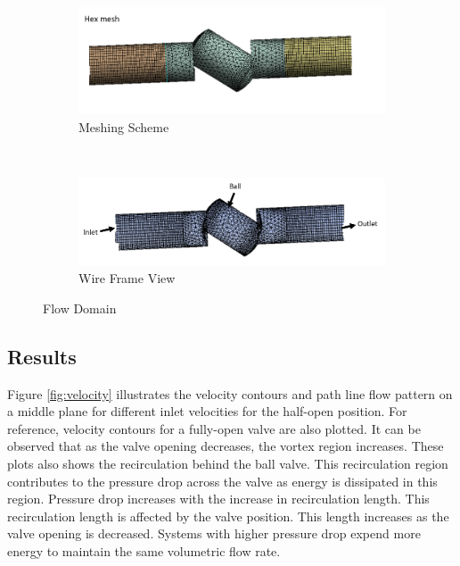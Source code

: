 \documentclass[]{article}
\begin{document}
\begin{figure}
	\centering
	\begin{subfigure}[h]{0.8\textwidth}
		\includegraphics[width=\textwidth]{Photos/Flow_Domain}
		\caption{Meshing Scheme}
	\end{subfigure}
	~ %
	
	\begin{subfigure}[h]{0.8\textwidth}
		\includegraphics[width=\textwidth]{Photos/Wire_Frame}
		\caption{Wire Frame View}
	\end{subfigure}
	\caption{Flow Domain}\label{fig:Mesh}
\end{figure}
\FloatBarrier
\subsection{Results}
Figure \ref{fig:velocity} illustrates the velocity contours and path line flow pattern on a middle plane for different inlet velocities for the half-open position. For reference, velocity contours for a fully-open valve are also plotted. It can be observed that as the valve opening decreases, the vortex region increases. These plots also shows the recirculation behind the ball valve. This recirculation region contributes to the pressure drop across the valve as energy is dissipated in this region. Pressure drop increases with the increase in recirculation length. This recirculation length is affected by the valve position. This length increases as the valve opening is decreased. Systems with higher pressure drop expend more energy to maintain the same volumetric flow rate.
\end{document}
